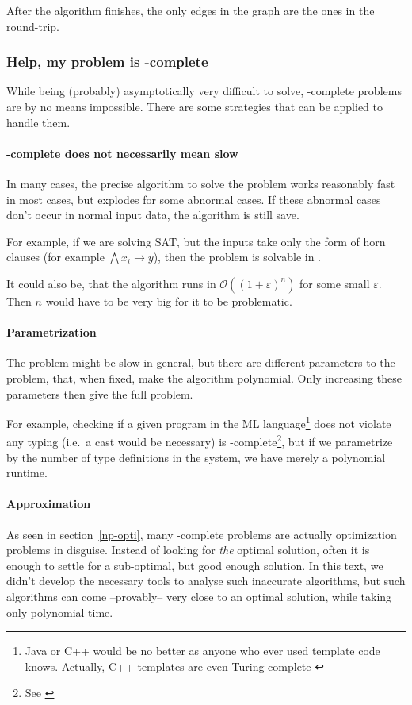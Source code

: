 After the algorithm finishes, the only edges in the graph are the ones in the round-trip.

\subsubsection{Help, my problem is \NPTIME-complete}
While being (probably) asymptotically very difficult to solve, 
\NPTIME-complete problems are by no means impossible. There are some 
strategies that can be applied to handle them.
\paragraph{\NPTIME-complete does not necessarily mean slow}
In many cases, the precise algorithm to solve the problem works reasonably 
fast in most cases, but explodes for some abnormal cases. If these abnormal 
cases don't occur in normal input data, the algorithm is still save.

For example, if we are solving SAT, but the inputs take only the form of horn 
clauses (for example $\bigwedge x_i \rightarrow y$), then the problem is 
solvable in \PTIME. 

It could also be, that the algorithm runs in $\mathcal{O}((1+\varepsilon)^n)$ 
for some small $\varepsilon$. Then $n$ would have to be very big for it to be problematic.
\paragraph{Parametrization}
The problem might be slow in general, but there are different parameters to 
the problem, that, when fixed, make the algorithm polynomial. Only increasing 
these parameters then give the full problem. 

For example, checking if a given program in the ML language\footnote{Java or
	C++ would be no better as anyone who ever used template code knows. Actually,
	C++ templates are even Turing-complete \cite{veldhuizen2003c++}}
does not violate any typing (i.e.\ a cast would be necessary) is
\NPTIME-complete\footnote{See \cite{downey1999parameterized}}, but if we
parametrize by the number of type definitions in the system, we have merely a
polynomial runtime.
\paragraph{Approximation}
As seen in section~\ref{np-opti}, many \NPTIME-complete problems are actually
optimization problems in disguise. Instead of looking for \emph{the} optimal
solution, often it is enough to settle for a sub-optimal, but good enough
solution.  In this text, we didn't develop the necessary tools to analyse such
inaccurate algorithms, but such algorithms can come --provably-- very close to
an optimal solution, while taking only polynomial time.

